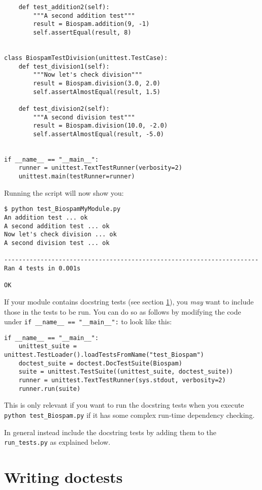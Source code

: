 \begin{itemize}
\begin{verbatim}
    def test_addition2(self):
        """A second addition test"""
        result = Biospam.addition(9, -1)
        self.assertEqual(result, 8)


class BiospamTestDivision(unittest.TestCase):
    def test_division1(self):
        """Now let's check division"""
        result = Biospam.division(3.0, 2.0)
        self.assertAlmostEqual(result, 1.5)

    def test_division2(self):
        """A second division test"""
        result = Biospam.division(10.0, -2.0)
        self.assertAlmostEqual(result, -5.0)


if __name__ == "__main__":
    runner = unittest.TextTestRunner(verbosity=2)
    unittest.main(testRunner=runner)
\end{verbatim}

        Running the script will now show you:

\begin{verbatim}
$ python test_BiospamMyModule.py
An addition test ... ok
A second addition test ... ok
Now let's check division ... ok
A second division test ... ok

----------------------------------------------------------------------
Ran 4 tests in 0.001s

OK
\end{verbatim}
\end{itemize}

If your module contains docstring tests (see section \ref{sec:doctest}),
you \emph{may} want to include those in the tests to be run. You can do so as
follows by modifying the code under \verb|if __name__ == "__main__":|
to look like this:

\begin{verbatim}
if __name__ == "__main__":
    unittest_suite = unittest.TestLoader().loadTestsFromName("test_Biospam")
    doctest_suite = doctest.DocTestSuite(Biospam)
    suite = unittest.TestSuite((unittest_suite, doctest_suite))
    runner = unittest.TextTestRunner(sys.stdout, verbosity=2)
    runner.run(suite)
\end{verbatim}

This is only relevant if you want to run the docstring tests when you
execute \verb|python test_Biospam.py| if it has some complex run-time
dependency checking.

In general instead include the docstring tests by adding them to the
\verb|run_tests.py| as explained below.

\section{Writing doctests}
\label{sec:doctest}

